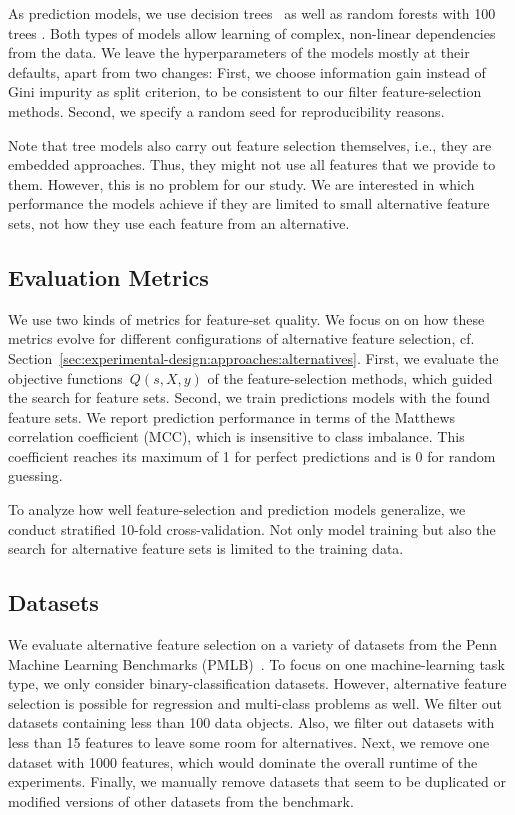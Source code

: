 \documentclass{article}
\theoremstyle{definition}
\begin{document}
As prediction models, we use decision trees~\cite{breiman1984classification} as well as random forests with 100 trees \cite{breiman2001random}.
Both types of models allow learning of complex, non-linear dependencies from the data.
We leave the hyperparameters of the models mostly at their defaults, apart from two changes:
First, we choose information gain instead of Gini impurity as split criterion, to be consistent to our filter feature-selection methods.
Second, we specify a random seed for reproducibility reasons.

Note that tree models also carry out feature selection themselves, i.e., they are embedded approaches.
Thus, they might not use all features that we provide to them.
However, this is no problem for our study.
We are interested in which performance the models achieve if they are limited to small alternative feature sets, not how they use each feature from an alternative.

\subsection{Evaluation Metrics}
\label{sec:experimental-design:evaluation}

We use two kinds of metrics for feature-set quality.
We focus on on how these metrics evolve for different configurations of alternative feature selection, cf. Section~\ref{sec:experimental-design:approaches:alternatives}.
First, we evaluate the objective functions~$Q(s,X,y)$ of the feature-selection methods, which guided the search for feature sets.
Second, we train predictions models with the found feature sets.
We report prediction performance in terms of the Matthews correlation coefficient (MCC), which is insensitive to class imbalance.
This coefficient reaches its maximum of 1 for perfect predictions and is 0 for random guessing.

To analyze how well feature-selection and prediction models generalize, we conduct stratified 10-fold cross-validation.
Not only model training but also the search for alternative feature sets is limited to the training data.

\subsection{Datasets}
\label{sec:experimental-design:datasets}

We evaluate alternative feature selection on a variety of datasets from the Penn Machine Learning Benchmarks (PMLB)~\cite{olson2017pmlb,romano2021pmlb}.
To focus on one machine-learning task type, we only consider binary-classification datasets.
However, alternative feature selection is possible for regression and multi-class problems as well.
We filter out datasets containing less than 100 data objects.
Also, we filter out datasets with less than 15 features to leave some room for alternatives.
Next, we remove one dataset with 1000 features, which would dominate the overall runtime of the experiments.
Finally, we manually remove datasets that seem to be duplicated or modified versions of other datasets from the benchmark.
\end{document}
